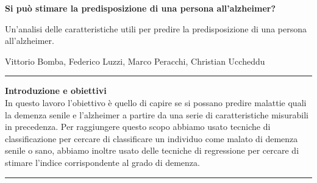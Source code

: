 \documentclass[10pt, a4paper,openany]{article}
\begin{document}
\begin{center}
\huge\textbf{\textcolor{ultramarine}{Si può stimare la predisposizione di una persona all'alzheimer?}}

Un'analisi delle caratteristiche utili per predire la predisposizione di una persona all'alzheimer.
\end{center}

\begin{center}
Vittorio Bomba, Federico Luzzi,  Marco Peracchi, Christian Uccheddu
\end{center}

\hrule
\vspace{0.3cm}

\begin{center}\textbf{{Introduzione e obiettivi}}
\\
In questo lavoro l'obiettivo è quello di capire se si possano predire malattie quali la demenza senile e l'alzheimer a partire da una serie di caratteristiche misurabili in precedenza. Per raggiungere questo scopo abbiamo usato tecniche di classificazione per cercare di classificare un individuo come malato di demenza senile o sano, abbiamo inoltre usato delle tecniche di regressione per cercare di stimare l'indice corrispondente al grado di demenza.
\vspace{0.3cm}
\hrule
\end{center}
\end{document}
